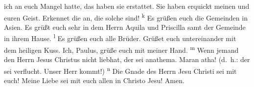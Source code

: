ich an euch Mangel hatte, das haben sie erstattet.  Sie
haben erquickt meinen und euren Geist. Erkennet die an, die solche sind!
\textsuperscript{k}  Es grüßen euch die Gemeinden in
Asien. Es grüßt euch sehr in dem Herrn Aquila und Priscilla samt der
Gemeinde in ihrem Hause. \textsuperscript{l}  Es grüßen
euch alle Brüder. Grüßet euch untereinander mit dem heiligen Kuss.
 Ich, Paulus, grüße euch mit meiner Hand.
\textsuperscript{m}  Wenn jemand den Herrn Jesus Christus
nicht liebhat, der sei anathema. Maran atha! (d.~h.: der sei verflucht.
Unser Herr kommt!) \textsuperscript{n}  Die Gnade des
Herrn Jesu Christi sei mit euch!  Meine Liebe sei mit
euch allen in Christo Jesu! Amen.
